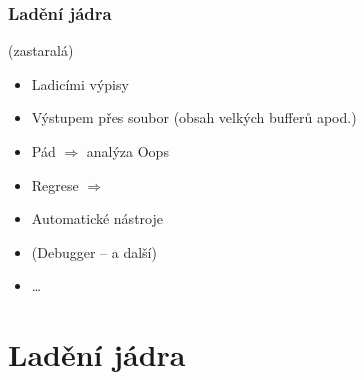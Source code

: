 
\shorthandoff{-} %

\begin{frame}
  \frametitle{Ladění jádra}

   (zastaralá)

  \bigskip

  \begin{itemize}
    \item Ladicími výpisy
    \pause
    \item Výstupem přes soubor (obsah velkých bufferů apod.)
    \pause
    \item Pád $\Rightarrow$ analýza Oops
    \pause
    \item Regrese $\Rightarrow$ 
    \pause
    \item Automatické nástroje
    \pause
    \item (Debugger --  a další)
    \pause
    \item \ldots
  \end{itemize}
\end{frame}

\iffimuni
\section{Ladění jádra}
\frame{\sectionpage}
\fi

